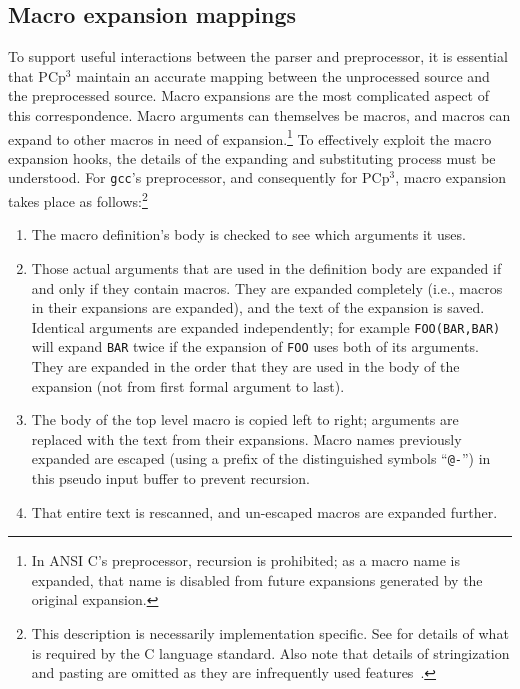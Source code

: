 \documentclass{article}
\newcommand{\pcp}{\mbox{\textsf{PCp}$^3$}}
\newcommand{\C}{\mbox{\textsf{C}}}
\newcommand{\ie}{i.e.,}
\begin{document}
\subsection{Macro expansion mappings}
To support useful interactions between the parser and preprocessor, it
is essential that \pcp{} maintain an accurate mapping between the
unprocessed source and the preprocessed source.  Macro expansions are
the most complicated aspect of this correspondence.  Macro arguments can
themselves be macros, and macros can expand to other macros in need of
expansion.\footnote{In ANSI \C{}'s preprocessor, recursion is
  prohibited; as a macro name is expanded, that name is disabled from
  future expansions generated by the original expansion.}  To
effectively exploit the macro expansion hooks, the details of the
expanding and substituting process must be understood.  For
\texttt{gcc}'s preprocessor, and consequently for \pcp{}, macro
expansion takes place as follows:\footnote{This description is necessarily
  implementation specific.  See \cite[Ch.~3]{Harbison91} for details of
  what is required by the \C{} language standard.  Also note that
  details of stringization and pasting are omitted as they are
  infrequently used features~\cite{EmpCpp}.}

\begin{enumerate}
\item The macro definition's body is checked to see which arguments it uses.
\item Those actual arguments that are used in the definition body are
      expanded if and only if they contain macros.  They are expanded
      completely (\ie{} macros in their expansions are expanded), and
      the text of the expansion is saved.  Identical arguments are
      expanded independently; for example \texttt{FOO(BAR,BAR)} will
      expand \texttt{BAR} twice if the expansion of \texttt{FOO} uses
      both of its arguments.  They are expanded in the order that they
      are used in the body of the expansion (not from first formal
      argument to last).
\item The body of the top level macro is copied left to right; arguments
      are replaced with the text from their expansions.  Macro names
      previously expanded are escaped (using a prefix of the
      distinguished symbols ``\texttt{@-}'') in this pseudo input buffer
      to prevent recursion.
\item That entire text is rescanned, and un-escaped macros are expanded
      further.
\end{enumerate}
\end{document}
